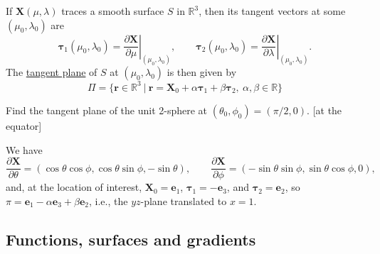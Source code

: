 \documentclass[10pt,notitlepage]{revtex4-1}
\newenvironment{example}[1][Example]{\begin{trivlist}
\item[\hskip \labelsep {\bfseries #1}]}{\end{trivlist}}
\newcommand{\dy}{\partial}
\newcommand{\ddy}[2]{\frac{\dy#1}{\dy#2}}
\newcommand{\eb}{\boldsymbol{e}}
\newcommand{\Xb}{{\boldsymbol{X}}}
\begin{document}
If $\Xb(\mu,\lambda)$ traces a smooth surface $S$ in $\mathbb{R}^3$, then its
tangent vectors at some $(\mu_0,\lambda_0)$ are
\begin{equation}
	\boldsymbol{\tau}_1 (\mu_0,\lambda_0)
	=\left.\ddy{\Xb}{\mu}\right|_{(\mu_0,\lambda_0)},\qquad
	\boldsymbol{\tau}_2 (\mu_0,\lambda_0)
	=\left.\ddy{\Xb}{\lambda}\right|_{(\mu_0,\lambda_0)}.
\end{equation}
The \underline{tangent plane} of $S$ at $(\mu_0,\lambda_0)$ is then given by
\begin{equation}
	\Pi=\{\boldsymbol{r}\in\mathbb{R}^3\ |\ \boldsymbol{r}=\Xb_0 
	+ \alpha \boldsymbol{\tau}_1 + \beta \boldsymbol{\tau}_2,\
	\alpha,\beta\in\mathbb{R}\}
\end{equation}
\begin{example}
	Find the tangent plane of the unit 2-sphere at
	$(\theta_0,\phi_0)=(\pi/2,0)$. [at the equator]
	
	We have
	\begin{equation}
		\ddy{\Xb}{\theta}=(\cos\theta\cos\phi,\cos\theta\sin\phi,-\sin\theta),
		\qquad
		\ddy{\Xb}{\phi}=(-\sin\theta\sin\phi,\sin\theta\cos\phi,0),
	\end{equation}
	and, at the location of interest, $\Xb_0=\eb_1$,
	$\boldsymbol{\tau}_1=-\eb_3$, and $\boldsymbol{\tau}_2=\eb_2$, so
	$\pi=\eb_1-\alpha\eb_3+\beta\eb_2$, i.e., the $yz$-plane translated to
	$x=1$.
\end{example}


\subsection{Functions, surfaces and gradients}
\end{document}
